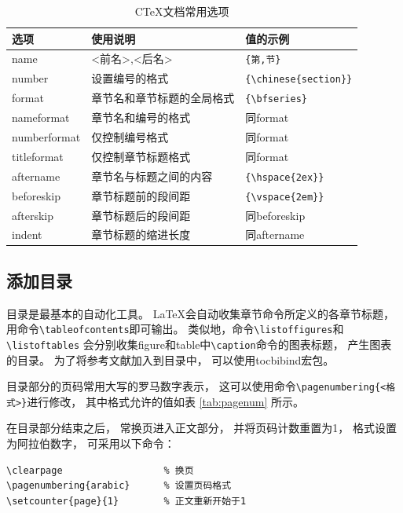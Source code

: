 \documentclass[UTF8]{ctexart}
\numberwithin{equation}{section}			%
\begin{document}
    \begin{table}
        \centering
        \caption{C\TeX 文档常用选项}
        \label{tab:ctexopt}
        \begin{tabular}{lll}
            \toprule
            选项 & 使用说明 & 值的示例 \\
            \midrule
            name & {<前名>,<后名>} & \verb|{第,节}| \\
            number & 设置编号的格式 & \verb|{\chinese{section}}| \\
            format & 章节名和章节标题的全局格式 & \verb|{\bfseries}| \\
            nameformat & 章节名和编号的格式 & 同format \\
            numberformat & 仅控制编号格式 & 同format \\
            titleformat & 仅控制章节标题格式 & 同format\\
            aftername & 章节名与标题之间的内容 & \verb|{\hspace{2ex}}| \\
            beforeskip & 章节标题前的段间距 & \verb|{\vspace{2em}}| \\
            afterskip & 章节标题后的段间距 & 同beforeskip \\
            indent & 章节标题的缩进长度 & 同aftername \\
            \bottomrule
        \end{tabular}
    \end{table}
    
    \subsection{添加目录}
    目录是最基本的自动化工具。
    \LaTeX 会自动收集章节命令所定义的各章节标题，
    用命令\verb|\tableofcontents|即可输出。
    类似地，命令\verb|\listoffigures|和\verb|\listoftables|
    会分别收集figure和table中\verb|\caption|命令的图表标题，
    产生图表的目录。
    为了将参考文献加入到目录中，
    可以使用tocbibind宏包。
    
    目录部分的页码常用大写的罗马数字表示，
    这可以使用命令\verb|\pagenumbering{<格式>}|进行修改，
    其中格式允许的值如表 \ref{tab:pagenum} 所示。
    
    在目录部分结束之后，
    常换页进入正文部分，
    并将页码计数重置为1，
    格式设置为阿拉伯数字，
    可采用以下命令：
    
\begin{lstlisting}
\clearpage					% 换页
\pagenumbering{arabic}		% 设置页码格式
\setcounter{page}{1}		% 正文重新开始于1
\end{lstlisting}
    
\end{document}
